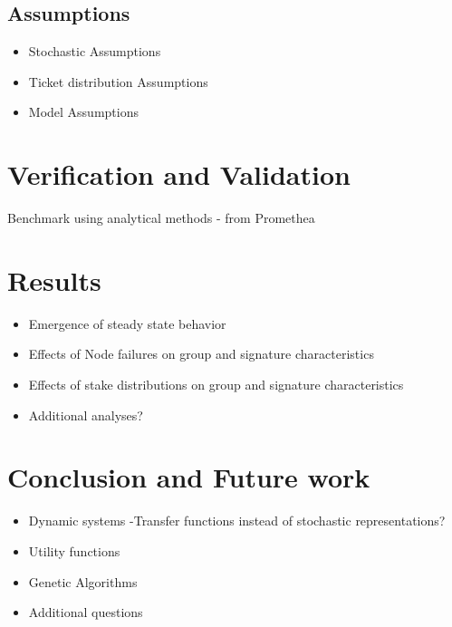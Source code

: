 \documentclass[conference]{IEEEtran}
\begin{document}
\subsection{Assumptions}
\begin{itemize}
\item Stochastic Assumptions
\item Ticket distribution Assumptions
\item Model Assumptions
\end{itemize}
    
\section{Verification and Validation}
Benchmark using analytical methods - from Promethea

\section{Results}
\begin{itemize}
\item Emergence of steady state behavior
\item Effects of Node failures on group and signature characteristics
\item Effects of stake distributions on group and signature characteristics
\item Additional analyses?
\end{itemize}

\section{Conclusion and Future work}
\begin{itemize}
\item Dynamic systems -Transfer functions instead of stochastic representations?
\item Utility functions
\item Genetic Algorithms
\item Additional questions
\end{itemize}



\end{document}
